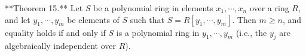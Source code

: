 **Theorem 15.** Let $S$ be a polynomial ring in elements $x_1, \cdots, x_n$ over a ring $R$, and let $y_1, \cdots, y_m$ be elements of $S$ such that $S = R[y_1, \cdots, y_m]$. Then $m \geq n$, and equality holds if and only if $S$ is a polynomial ring in $y_1, \cdots, y_m$ (i.e., the $y_j$ are algebraically independent over $R$).
